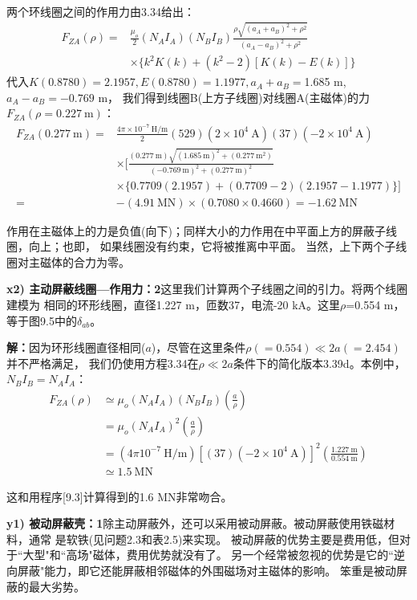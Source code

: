两个环线圈之间的作用力由3.34给出：
\begin{align*}%
F_{ZA}(\rho)=&\frac{\mu_o}{2}(N_AI_A)(N_BI_B)\frac{\rho\sqrt{(a_A+a_B)^2+\rho^2}}{(a_A-a_B)^2+\rho^2}\\
&\times\{k^2K(k)+(k^2-2)[K(k)-E(k)]\} \tag{3.34}
\end{align*}
代入$K(0.8780)=2.1957,E(0.8780)=1.1977,a_A+a_B=$1.685 m, $a_A-a_B=-0.769$ m，
我们得到线圈B(上方子线圈)对线圈A(主磁体)的力$F_{ZA}(\rho=0.227\ \mathrm{m})$：
\begin{align*}%
F_{ZA}(0.277\ \mathrm{m})=&\frac{4\pi\times 10^{-7}\ \mathrm{H/m}}{2}(529)(2\times 10^4\  \mathrm{A})(37)(-2\times 10^{4}\ \mathrm{A})\\
&\times \big[\frac{(0.277\ \mathrm{m})\sqrt{(1.685\ \mathrm{m})^2+(0.277\ \mathrm{m}^2)}}{(-0.769\ \mathrm{m})^2+(0.277\ \mathrm{m})^2}\\
&\times\{0.7709(2.1957)+(0.7709-2)(2.1957-1.1977)\}\big]\\
=&-(4.91\ \mathrm{MN})\times(0.7080\times 0.4660)=-1.62\ \mathrm{MN}
\end{align*}

作用在主磁体上的力是负值(向下)；同样大小的力作用在中平面上方的屏蔽子线圈，向上；也即，
如果线圈没有约束，它将被推离中平面。
当然，上下两个子线圈对主磁体的合力为零。

\textbf{x2) 主动屏蔽线圈---作用力：2}\qquad 这里我们计算两个子线圈之间的引力。将两个线圈建模为
相同的环形线圈，直径1.227 m，匝数37，电流-20 kA。这里$\rho$=0.554 m，等于图9.5中的$\delta_{ab}$。

\textbf{解：}因为环形线圈直径相同($a$)，尽管在这里条件$\rho(=0.554)\ll 2a(=2.454)$并不严格满足，
我们仍使用方程3.34在$\rho\ll 2a$条件下的简化版本3.39d。本例中，$N_B I_B=N_A I_A$：
\begin{align*}%
F_{ZA}(\rho)&\simeq\mu_o(N_AI_A)(N_BI_B)(\frac{a}{\rho})\\ \tag{3.39d}
&=\mu_o(N_AI_A)^2(\frac{a}{\rho})\\
&=(4\pi10^{-7}\ \mathrm{H/m})[(37)(-2\times 10^4\ \mathrm{A})]^2(\frac{1.227\ \mathrm{m}}{0.554\ \mathrm{m}})\\
&\simeq 1.5\ \mathrm{MN}
\end{align*}

这和用程序[9.3]计算得到的1.6 MN非常吻合。

\textbf{y1) 被动屏蔽壳：1}\qquad 除主动屏蔽外，还可以采用被动屏蔽。被动屏蔽使用铁磁材料，通常
是软铁(见问题2.3和表2.5)来实现。
被动屏蔽的优势主要是费用低，但对于``大型"和``高场"磁体，费用优势就没有了。
另一个经常被忽视的优势是它的``逆向屏蔽"能力，即它还能屏蔽相邻磁体的外围磁场对主磁体的影响。
笨重是被动屏蔽的最大劣势。

